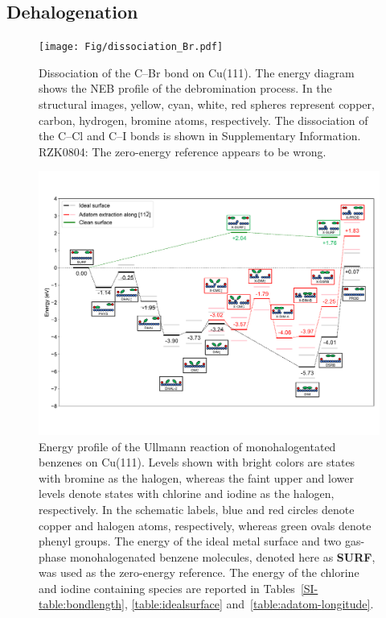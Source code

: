 \documentclass[journal=jacsat,manuscript=article]{achemso}
\newcommand{\comm}{\color{ForestGreen}} %
\newcommand{\sinfo}{Supplementary Information}
\begin{document}
\ifdefined\INTERNAL
\subsection{Dehalogenation}
\fi

\begin{figure}[hbt]
\centering
\texttt{[image: Fig/dissociation\_Br.pdf]}
\caption{Dissociation of the C--Br bond on Cu(111). The energy diagram shows the NEB profile of the debromination process. In the structural images, yellow, cyan, white, red spheres represent copper, carbon, hydrogen, bromine atoms, respectively. The dissociation of the C--Cl and C--I bonds is shown in \sinfo.
{\comm RZK0804: The zero-energy reference appears to be wrong.}
}
\label{fig:dissociation_Br}
\end{figure}

\begin{figure}[hbt]
\centering
\includegraphics[width=1.\textwidth]{Fig/main-profile.pdf}
\caption{Energy profile of the Ullmann reaction of monohalogentated benzenes on Cu(111). Levels shown with bright colors are states with bromine as the halogen, whereas the faint upper and lower levels denote states with chlorine and iodine as the halogen, respectively. In the schematic labels, blue and red circles denote copper and halogen atoms, respectively, whereas green ovals denote phenyl groups. The energy of the ideal metal surface and two gas-phase monohalogenated benzene molecules, denoted here as \textbf{SURF}, was used as the zero-energy reference. The energy of the chlorine and iodine containing species are reported in Tables~\ref{SI-table:bondlength}, \ref{table:idealsurface} and~\ref{table:adatom-longitude}.
}
\label{fig:completeenergy}
\end{figure}
\end{document}
